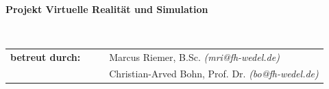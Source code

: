 \documentclass[a4paper, 12pt, hidelinks]{article}
\begin{document}
\begin{verbatim}


\end{verbatim}

\begin{center}
\textbf{Projekt Virtuelle Realität und Simulation}
\end{center}

\begin{verbatim}


\end{verbatim}

\begin{flushleft}
\begin{tabular}{llll}

\textbf{betreut durch:}
& & & Marcus Riemer, B.Sc. \emph{(mri@fh-wedel.de)}\\
& & & Christian-Arved Bohn, Prof. Dr. \emph{(bo@fh-wedel.de)}\\

\end{tabular}
\end{flushleft}


\newpage


\newpage


\tableofcontents
\newpage









\end{document}
